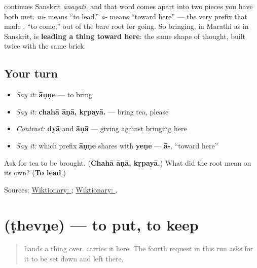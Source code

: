 \begin{cousinweb}
\textbf{} continues Sanskrit \textbf{} \emph{ānayati}, and that word comes apart into two pieces you have both met. \textbf{} \emph{nī-} means \textquotedblleft{}to lead.\textquotedblright{} \textbf{} \emph{ā-} means \textquotedblleft{}toward here\textquotedblright{} — the very prefix that made \textbf{}, \textquotedblleft{}to come,\textquotedblright{} out of the bare root for going. So bringing, in Marathi as in Sanskrit, is \textbf{leading a thing toward here}: the same shape of thought, built twice with the same brick.
\end{cousinweb}

\subsection*{Your turn}
\begin{itemize}
\raggedright
  \item \emph{Say it:} \textbf{āṇṇe} — to bring
  \item \emph{Say it:} \textbf{chahā āṇā, kṛpayā.} — bring tea, please
  \item \emph{Contrast:} \textbf{dyā} and \textbf{āṇā} — giving against bringing here
  \item \emph{Say it:} which prefix \textbf{āṇṇe} shares with \textbf{yeṇe} — \textbf{ā-}, \textquotedblleft{}toward here\textquotedblright{}
\end{itemize}

\begin{tcolorbox}[breakable,colback=teal!4,colframe=teal!35!black,title={Before you move on}]
Ask for tea to be brought. (\textbf{Chahā āṇā, kṛpayā.}) What did the root \textbf{} mean on its own? (\textbf{To lead}.)

Sources: \href{https://en.wiktionary.org/wiki/\%E0\%A4\%86\%E0\%A4\%A3\%E0\%A4\%A3\%E0\%A5\%87}{Wiktionary: }; \href{https://en.wiktionary.org/wiki/\%E0\%A4\%A8\%E0\%A5\%80}{Wiktionary: }.
\end{tcolorbox}
\section[\texorpdfstring{\mr{ठेवणे} (ṭhevṇe)}{ठेवणे (ṭhevṇe)}]{ (ṭhevṇe) — to put, to keep}

\label{lesson:MR-C22-thevne}



\begin{quote}
\textbf{} hands a thing over. \textbf{} carries it here. The fourth request in this run asks for it to be set down and left there.
\end{quote}

